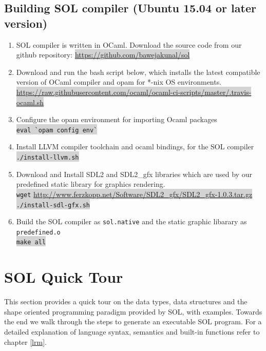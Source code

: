 \documentclass[letterpaper,12pt]{report}
\begin{document}
    \subsection{Building SOL compiler (Ubuntu 15.04 or later version)}
    \begin{enumerate}
      \item SOL compiler is written in OCaml. Download the source code from our github repository: \colorbox{lightgray}{{\href{https://github.com/bawejakunal/sol}{https://github.com/bawejakunal/sol}}}

      \item Download and run the bash script below, which installs the latest compatible version of OCaml compiler and opam for *-nix OS environments.\\
      \colorbox{lightgray}{{\href{https://raw.githubusercontent.com/ocaml/ocaml-ci-scripts/master/.travis-ocaml.sh}{https://raw.githubusercontent.com/ocaml/ocaml-ci-scripts/master/.travis-ocaml.sh}}}

      \item Configure the opam environment for importing Ocaml packages\\
      \colorbox{lightgray}{\lstinline[style=bash]{eval `opam config env`}}

      \item Install LLVM compiler toolchain and ocaml bindings, for the SOL compiler\\
      \colorbox{lightgray}{\lstinline[style=bash]{./install-llvm.sh}}

      \item Download and Install SDL2 and SDL2\_gfx libraries which are used by our predefined static library for graphics rendering.\\
        \colorbox{lightgray}{\lstinline[style=bash]{wget} \href{http://www.ferzkopp.net/Software/SDL2\_gfx/SDL2\_gfx-1.0.3.tar.gz}{http://www.ferzkopp.net/Software/SDL2\_gfx/SDL2\_gfx-1.0.3.tar.gz}}\\
        \colorbox{lightgray}{\lstinline[style=bash]{./install-sdl-gfx.sh}}

      \item Build the SOL compiler as \texttt{sol.native} and the static graphic libarary as \texttt{predefined.o}\\
      \colorbox{lightgray}{\lstinline[style=bash]{make all}}

    \end{enumerate}

  \section{SOL Quick Tour}
  This section provides a quick tour on the data types, data structures and the shape oriented programming paradigm provided by SOL, with examples. Towards the end we walk through the steps to generate an executable SOL program. For a detailed explanation of language syntax, semantics and built-in functions refer to chapter \ref{lrm}.
\end{document}

